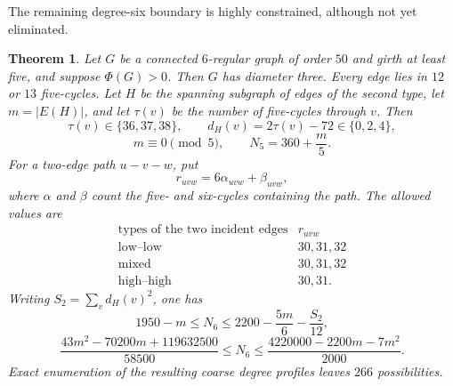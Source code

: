 \documentclass[a4paper,10pt,reqno]{amsart}
\theoremstyle{plain}
\newtheorem{theorem}{Theorem}[section]
\theoremstyle{definition}
\theoremstyle{remark}
\begin{document}
The remaining degree-six boundary is highly constrained, although not yet
eliminated.

\begin{theorem}\label{thm:order50-feasibility}
Let \(G\) be a connected \(6\)-regular graph of order \(50\) and girth
at least five, and suppose \(\Phi(G)>0\).  Then \(G\) has diameter three.
Every edge lies in \(12\) or \(13\) five-cycles.  Let \(H\) be the spanning
subgraph of edges of the second type, let \(m=|E(H)|\), and let \(\tau(v)\) be
the number of five-cycles through \(v\).  Then
\[
 \tau(v)\in\{36,37,38\},
 \qquad d_H(v)=2\tau(v)-72\in\{0,2,4\},
\]
\[
 m\equiv0\pmod5,
 \qquad N_5=360+\frac m5.
\]
For a two-edge path \(u-v-w\), put
\[
 r_{uvw}=6\alpha_{uvw}+\beta_{uvw},
\]
where \(\alpha\) and \(\beta\) count the five- and six-cycles containing the
path.  The allowed values are
\[
\begin{array}{c|c}
\text{types of the two incident edges}&r_{uvw}\\
\hline
\text{low--low}&30,31,32\\
\text{mixed}&30,31,32\\
\text{high--high}&30,31.
\end{array}
\]
Writing \(S_2=\sum_vd_H(v)^2\), one has
\[
 1950-m\le N_6
 \le2200-\frac{5m}{6}-\frac{S_2}{12},
\]
\[
 \frac{43m^2-70200m+119632500}{58500}
 \le N_6
 \le\frac{4220000-2200m-7m^2}{2000}.
\]
Exact enumeration of the resulting coarse degree profiles leaves \(266\)
possibilities.
\end{theorem}
\end{document}
